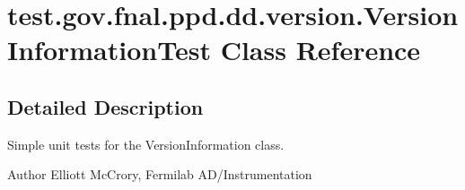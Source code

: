 \hypertarget{classtest_1_1gov_1_1fnal_1_1ppd_1_1dd_1_1version_1_1VersionInformationTest}{\section{test.\-gov.\-fnal.\-ppd.\-dd.\-version.\-Version\-Information\-Test Class Reference}
\label{classtest_1_1gov_1_1fnal_1_1ppd_1_1dd_1_1version_1_1VersionInformationTest}
}


\subsection{Detailed Description}
Simple unit tests for the Version\-Information class.

\begin{DoxyAuthor}{Author}
Elliott Mc\-Crory, Fermilab A\-D/\-Instrumentation 
\end{DoxyAuthor}
